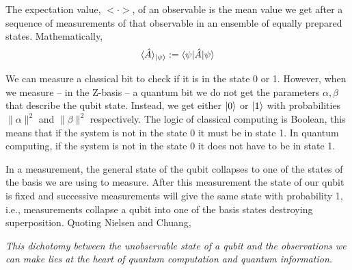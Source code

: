 \begin{definition}
    The expectation value, $<\cdot>$, of an observable is the mean value we get after a sequence of measurements of that observable in an ensemble of equally prepared states.
        Mathematically,
    \begin{equation}
        \langle\hat{A}\rangle_{\ket{\psi}} := \braket{\psi |\hat{A}| \psi}
    \end{equation}
\end{definition}

We can measure a classical bit to check if it is in the state 0 or 1. However, when we measure -- in the Z-basis -- a quantum bit we do not get the parameters $\alpha, \beta$ that describe the qubit state. Instead, we get either $\ket{0}$ or $\ket{1}$ with probabilities $\|\alpha\|^{2}$ and $\|\beta\|^{2}$ respectively. The logic of classical computing is Boolean, this means that if the system is not in the state 0 it must be in state 1. In quantum computing, if the system is not in the state 0 it does not have to be in state 1.   

In a measurement, the general state of the qubit collapses to one of the states of the basis we are using to measure. After this measurement the state of our qubit is fixed and successive measurements will give the same state with probability 1, i.e., measurements collapse a qubit into one of the basis states destroying superposition. Quoting Nielsen and Chuang,
\begin{displayquote}
\textit{This dichotomy between the unobservable state of a qubit and the observations we can make lies at the heart of quantum computation and quantum information.}
\end{displayquote}
